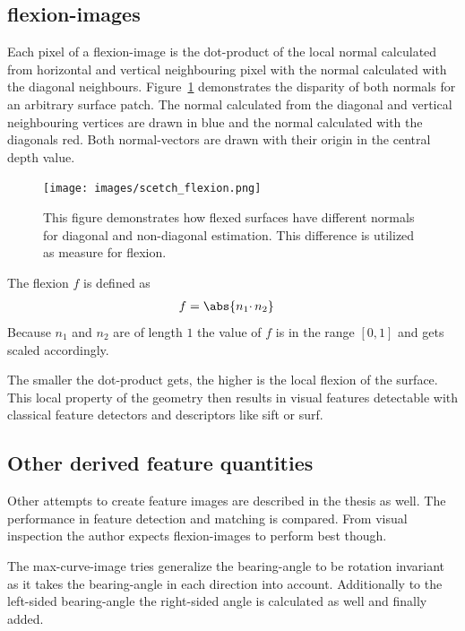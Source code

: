 \subsection{\Glspl{flexion-image}}\label{flexion-image-section}

Each pixel of a \Gls{flexion-image} is the dot-product of the local normal
calculated from horizontal and vertical neighbouring pixel with the
normal calculated with the diagonal neighbours.
Figure~\ref{fig:flexion-image-scetched} demonstrates the disparity of both normals for an arbitrary surface patch.
The normal calculated from the diagonal and vertical neighbouring vertices are drawn in blue and the normal calculated with the diagonals red.
Both normal-vectors are drawn with their origin in the central depth value.

\begin{figure}[H]
    \centering
    \texttt{[image: images/scetch\_flexion.png]}
    \caption[Schematic Representation of Flexion]{This figure demonstrates how flexed surfaces have different normals for diagonal and non-diagonal estimation. This difference is utilized as measure for flexion.}%
    \label{fig:flexion-image-scetched}
\end{figure}

The flexion $f$ is defined as
\begin{align}
    f &= \abs{n_1 \cdotp n_2}
\end{align}
Because $n_1$ and $n_2$ are of length $1$ the value of $f$ is in the range $[0, 1]$ and gets scaled accordingly.

The smaller the dot-product gets, the higher is the local flexion of the
surface. This local property of the geometry then results in visual
features detectable with classical feature detectors and descriptors like
\Gls{sift} or \Gls{surf}.

\subsection{Other derived feature quantities}

Other attempts to create feature images are described in the thesis as well.
The performance in feature detection and matching is compared.
From visual inspection the author expects \Glspl{flexion-image} to perform best though.

The \gls{max-curve-image} tries generalize the \gls{bearing-angle} to be rotation invariant as it takes the \gls{bearing-angle} in each direction into account.
Additionally to the left-sided \gls{bearing-angle} the right-sided angle is calculated as well and finally added.

